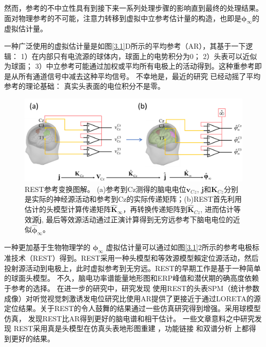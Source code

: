 然而，参考的不中立性具有到接下来一系列处理步骤的影响直到最终的处理结果。面对物理参考的不可能，注意力转移到虚拟中立参考估计量的构造，也即是$\mathbf{\phi}_{\infty}$的虚拟估计量。

一种广泛使用的虚拟估计量是如图\ref{3.1}D所示的平均参考（AR），其基于一下逻辑：
1）在内部只有电流源的球体内，球面上的电势积分为0； 2）头表可以近似为球面； 3）中立参考可能通过加权或平均所有电极上的活动得到。这种重参考即是从所有通道信号中减去这种平均信号。
不幸地是，最近的研究 已经动摇了平均参考的理论基础： 真实头表面的电位积分不是零。
\begin{figure}[!ht]
	\centering
	\includegraphics[width=15cm]{pic/Frontier/figure2.png}
	\caption{REST参考变换图解。 (a)参考到Cz测得的脑电电位$\mathbf{v}_{Cz}$, $\mathbf{j}$和$\mathbf{K}_{Cz}$分别是实际的神经源活动和参考到Cz的实际传递矩阵；(b)REST首先利用估计的头模型计算传递矩阵$\hat{\mathbf{K}}_\infty$，再转换传递矩阵到$\hat{\mathbf{K}}_{Cz}$, 进而估计等效源$\hat{\mathbf{j}}$, 最后等效源活动通过正演计算得到无穷远参考下脑电电位的近似$\hat{\mathbf{\phi}}_\infty$。}
	\label{3.2}
\end{figure}
一种更加基于生物物理学的 $\mathbf{\phi}_{\infty}$ 虚拟估计量可以通过如图\ref{3.1}2所示的参考电极标准技术（REST）得到。REST采用一种头模型和等效源模型賴定位源活动，然后投射源活动到电极上，此时虚拟参考到无穷远。REST的早期工作是基于一种简单的球面头模型。 不久，脑电功率谱能量地形图和ERP峰值和潜伏期的确高度依赖于参考的选择。 在进一步的研究中，研究发现 使用REST的头表SPM（统计参数成像）对听觉视觉刺激诱发电位研究比使用AR提供了更接近于通过LORETA的源定位结果。关于REST的令人鼓舞的结果通过一些仿真研究得到增强。采用球模型仿真，
 发现REST比AR得到更好的脑电谱和相干估计。 一些文章意料之中研究发现 REST采用真是头模型在仿真头表地形图重建 ，功能链接 
和双谱分析  上都得到更好的结果。

